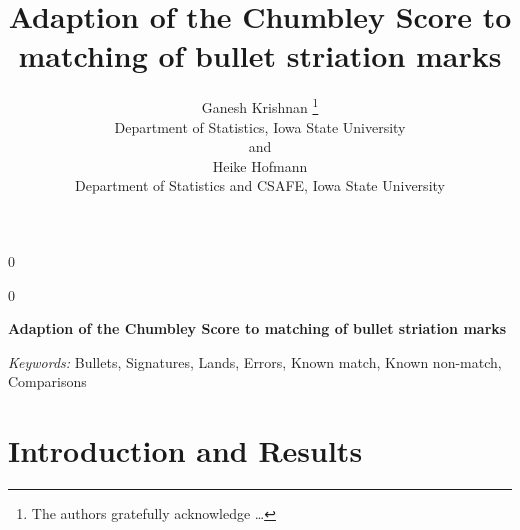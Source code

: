 \documentclass[12pt]{article}
\newcommand{\blind}{0}
\begin{document}
\def\spacingset#1{\renewcommand{\baselinestretch}%
{#1}\small\normalsize} \spacingset{1}



\blind
{
  \title{\bf Adaption of the Chumbley Score to matching of bullet striation marks}

  \author{
        Ganesh Krishnan \thanks{The authors gratefully acknowledge \ldots{}} \\
    Department of Statistics, Iowa State University\\
     and \\     Heike Hofmann \\
    Department of Statistics and CSAFE, Iowa State University\\
      }
  \maketitle
} \fi

\blind
{
  \bigskip
  \bigskip
  \bigskip
  \begin{center}
    {\LARGE\bf Adaption of the Chumbley Score to matching of bullet striation marks}
  \end{center}
  \medskip
} \fi

\bigskip
% 

\noindent%
{\it Keywords:} Bullets, Signatures, Lands, Errors, Known match, Known non-match,
Comparisons
\vfill

\newpage
\spacingset{1.45} %

\newcommand{\hh}[1]{{\textcolor{orange}{#1}}}
\newcommand{\gk}[1]{{\textcolor{green}{#1}}}
\newcommand{\cited}[1]{{\textcolor{red}{#1}}}

\section{Introduction and Results}\label{introduction-and-results}
\end{document}
